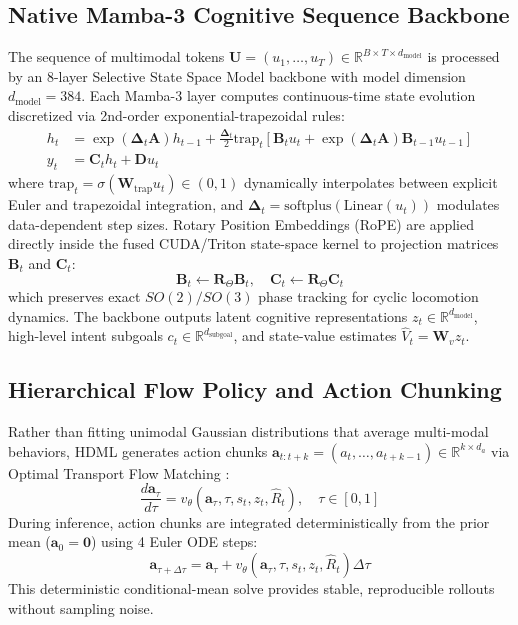 \documentclass{article}
\begin{document}
\subsection{Native Mamba-3 Cognitive Sequence Backbone}
The sequence of multimodal tokens $\mathbf{U} = (u_1, \dots, u_T) \in \mathbb{R}^{B \times T \times d_{\text{model}}}$ is processed by an 8-layer Selective State Space Model backbone with model dimension $d_{\text{model}} = 384$. Each Mamba-3 layer computes continuous-time state evolution discretized via 2nd-order exponential-trapezoidal rules:
\begin{align}
    h_t &= \exp(\mathbf{\Delta}_t \mathbf{A}) h_{t-1} + \frac{\mathbf{\Delta}_t}{2} \text{trap}_t \left[ \mathbf{B}_t u_t + \exp(\mathbf{\Delta}_t \mathbf{A}) \mathbf{B}_{t-1} u_{t-1} \right] \\
    y_t &= \mathbf{C}_t h_t + \mathbf{D} u_t
\end{align}
where $\text{trap}_t = \sigma(\mathbf{W}_{\text{trap}} u_t) \in (0, 1)$ dynamically interpolates between explicit Euler and trapezoidal integration, and $\mathbf{\Delta}_t = \text{softplus}(\text{Linear}(u_t))$ modulates data-dependent step sizes. Rotary Position Embeddings (RoPE) are applied directly inside the fused CUDA/Triton state-space kernel to projection matrices $\mathbf{B}_t$ and $\mathbf{C}_t$:
\begin{equation}
    \mathbf{B}_t \leftarrow \mathbf{R}_{\Theta} \mathbf{B}_t, \quad \mathbf{C}_t \leftarrow \mathbf{R}_{\Theta} \mathbf{C}_t
\end{equation}
which preserves exact $SO(2)/SO(3)$ phase tracking for cyclic locomotion dynamics. The backbone outputs latent cognitive representations $z_t \in \mathbb{R}^{d_{\text{model}}}$, high-level intent subgoals $c_t \in \mathbb{R}^{d_{\text{subgoal}}}$, and state-value estimates $\hat{V}_t = \mathbf{W}_v z_t$.

\subsection{Hierarchical Flow Policy and Action Chunking}
Rather than fitting unimodal Gaussian distributions that average multi-modal behaviors, HDML generates action chunks $\mathbf{a}_{t:t+k} = (a_t, \dots, a_{t+k-1}) \in \mathbb{R}^{k \times d_a}$ via Optimal Transport Flow Matching \cite{lipman2023flow}:
\begin{equation}
    \frac{d \mathbf{a}_\tau}{d\tau} = v_\theta(\mathbf{a}_\tau, \tau, s_t, z_t, \hat{R}_t), \quad \tau \in [0, 1]
\end{equation}
During inference, action chunks are integrated deterministically from the prior mean ($\mathbf{a}_0 = \mathbf{0}$) using 4 Euler ODE steps:
\begin{equation}
    \mathbf{a}_{\tau + \Delta\tau} = \mathbf{a}_\tau + v_\theta(\mathbf{a}_\tau, \tau, s_t, z_t, \hat{R}_t) \Delta\tau
\end{equation}
This deterministic conditional-mean solve provides stable, reproducible rollouts without sampling noise.
\end{document}
